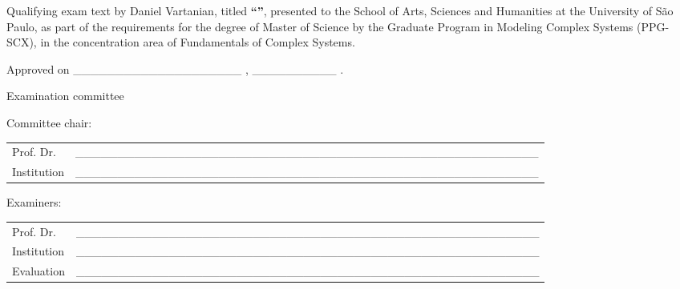\documentclass[
  12pt,
  a4paper,
  oneside]{tesesusp}
\begin{document}
\begin{folhadeaprovacao}
\noindent
Qualifying exam text by Daniel Vartanian, titled \textbf{``\imprimirtitulo''}, presented to the School of Arts, Sciences and Humanities at the University of São Paulo, as part of the requirements for the degree of Master of Science by the Graduate Program in Modeling Complex Systems (PPG-SCX), in the concentration area of Fundamentals of Complex Systems.


\vspace*{1.5cm}

\noindent
Approved on \_\_\_\_\_\_\_\_\_\_\_\_\_\_\_\_\_\_\_\_ , \_\_\_\_\_\_\_\_\_\_ .

\vspace*{1.5cm}

\begin{center}
\noindent Examination committee
\end{center}

\vspace*{0.5cm}

\noindent Committee chair:

\vspace*{0.25cm}

\renewcommand{\arraystretch}{2}
\setlength{\arrayrulewidth}{0pt}
\setlength{\tabcolsep}{0pt}
\noindent
\begin{tabular}{m{2cm} P{14cm}}
  Prof. Dr. & \_\_\_\_\_\_\_\_\_\_\_\_\_\_\_\_\_\_\_\_\_\_\_\_\_\_\_\_\_\_\_\_\_\_\_\_\_\_\_\_\_\_\_\_\_\_\_\_\_\_\_\_\_\_\_ \\
  Institution & \_\_\_\_\_\_\_\_\_\_\_\_\_\_\_\_\_\_\_\_\_\_\_\_\_\_\_\_\_\_\_\_\_\_\_\_\_\_\_\_\_\_\_\_\_\_\_\_\_\_\_\_\_\_\_ \\
\end{tabular}

\vspace*{1cm}

\noindent Examiners:

\vspace*{0.25cm}

\noindent
\begin{tabular}{m{2cm} P{14cm}}
  Prof. Dr. & \_\_\_\_\_\_\_\_\_\_\_\_\_\_\_\_\_\_\_\_\_\_\_\_\_\_\_\_\_\_\_\_\_\_\_\_\_\_\_\_\_\_\_\_\_\_\_\_\_\_\_\_\_\_\_ \\
  Institution & \_\_\_\_\_\_\_\_\_\_\_\_\_\_\_\_\_\_\_\_\_\_\_\_\_\_\_\_\_\_\_\_\_\_\_\_\_\_\_\_\_\_\_\_\_\_\_\_\_\_\_\_\_\_\_ \\
  Evaluation & \_\_\_\_\_\_\_\_\_\_\_\_\_\_\_\_\_\_\_\_\_\_\_\_\_\_\_\_\_\_\_\_\_\_\_\_\_\_\_\_\_\_\_\_\_\_\_\_\_\_\_\_\_\_\_ \\
\end{tabular}


\end{folhadeaprovacao}
\end{document}
